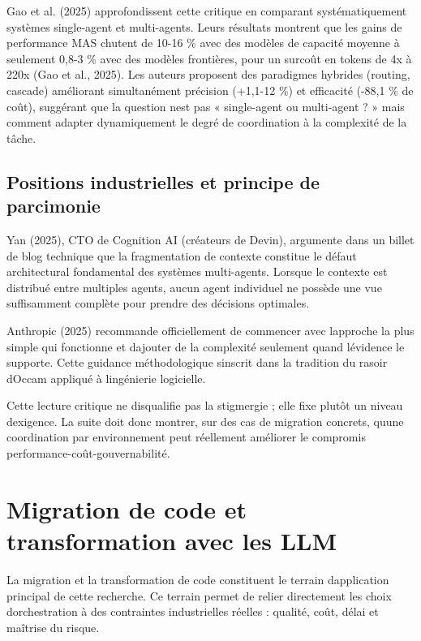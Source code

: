 \documentclass[12pt,a4paper]{article}
\begin{document}
Gao et al. (2025) approfondissent cette critique en comparant
systématiquement systèmes single-agent et multi-agents. Leurs résultats
montrent que les gains de performance MAS chutent de 10-16 \% avec des
modèles de capacité moyenne à seulement 0,8-3 \% avec des modèles
frontières, pour un surcoût en tokens de 4x à 220x (Gao et al., 2025).
Les auteurs proposent des paradigmes hybrides (routing, cascade)
améliorant simultanément précision (+1,1-12 \%) et efficacité (-88,1 \%
de coût), suggérant que la question n\textquotesingle est pas «
single-agent ou multi-agent ? » mais comment adapter dynamiquement le
degré de coordination à la complexité de la tâche.

\subsection{Positions industrielles et principe de
parcimonie}\label{positions-industrielles-et-principe-de-parcimonie}

Yan (2025), CTO de Cognition AI (créateurs de Devin), argumente dans un
billet de blog technique que la fragmentation de contexte constitue le
défaut architectural fondamental des systèmes multi-agents. Lorsque le
contexte est distribué entre multiples agents, aucun agent individuel ne
possède une vue suffisamment complète pour prendre des décisions
optimales.

Anthropic (2025) recommande officiellement de commencer avec
l\textquotesingle approche la plus simple qui fonctionne et
d\textquotesingle ajouter de la complexité seulement quand
l\textquotesingle évidence le supporte. Cette guidance méthodologique
s\textquotesingle inscrit dans la tradition du rasoir
d\textquotesingle Occam appliqué à l\textquotesingle ingénierie
logicielle.

Cette lecture critique ne disqualifie pas la stigmergie ; elle fixe
plutôt un niveau d\textquotesingle exigence. La suite doit donc montrer,
sur des cas de migration concrets, qu\textquotesingle une coordination
par environnement peut réellement améliorer le compromis
performance-coût-gouvernabilité.

\section{Migration de code et transformation avec les
LLM}\label{migration-de-code-et-transformation-avec-les-llm}

La migration et la transformation de code constituent le terrain
d\textquotesingle application principal de cette recherche. Ce terrain
permet de relier directement les choix d\textquotesingle orchestration à
des contraintes industrielles réelles : qualité, coût, délai et maîtrise
du risque.
\end{document}
